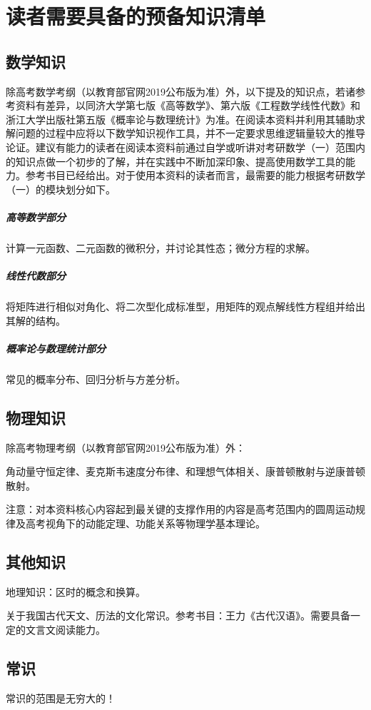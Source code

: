 \chapter{读者需要具备的预备知识清单}
\section{数学知识}
\noindent 除高考数学考纲（以教育部官网2019公布版为准）外，以下提及的知识点，若诸参考资料有差异，以同济大学第七版《高等数学》、第六版《工程数学线性代数》和浙江大学出版社第五版《概率论与数理统计》为准。在阅读本资料并利用其辅助求解问题的过程中应将以下数学知识视作工具，并不一定要求思维逻辑量较大的推导论证。建议有能力的读者在阅读本资料前通过自学或听讲对考研数学（一）范围内的知识点做一个初步的了解，并在实践中不断加深印象、提高使用数学工具的能力。参考书目已经给出。对于使用本资料的读者而言，最需要的能力根据考研数学（一）的模块划分如下。
\paragraph{高等数学部分}
计算一元函数、二元函数的微积分，并讨论其性态；微分方程的求解。
\paragraph{线性代数部分}
将矩阵进行相似对角化、将二次型化成标准型，用矩阵的观点解线性方程组并给出其解的结构。
\paragraph{概率论与数理统计部分}
常见的概率分布、回归分析与方差分析。
\section{物理知识}
\noindent 除高考物理考纲（以教育部官网2019公布版为准）外：

角动量守恒定律、麦克斯韦速度分布律、和理想气体相关、康普顿散射与逆康普顿散射。

注意：对本资料核心内容起到最关键的支撑作用的内容是高考范围内的圆周运动规律及高考视角下的动能定理、功能关系等物理学基本理论。
\section{其他知识}
\noindent 地理知识：区时的概念和换算。

\noindent 关于我国古代天文、历法的文化常识。参考书目：王力《古代汉语》。需要具备一定的文言文阅读能力。
\section{常识}
\begin{Large}
	常识的范围是无穷大的！
\end{Large}
